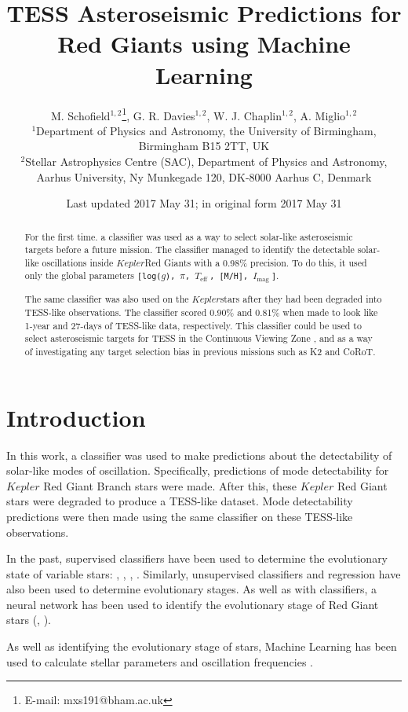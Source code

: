 \documentclass[a4paper,fleqn,usenatbib,useAMS]{mnras}
\title[Asteroseismology with Machine Learning]{TESS Asteroseismic Predictions for Red Giants using Machine Learning}
\author[M. Schofield et al.]{M. Schofield$^{1, 2}$\thanks{E-mail: mxs191@bham.ac.uk}, G. R. Davies$^{1, 2}$, W. J. Chaplin$^{1, 2}$, A. Miglio$^{1, 2}$
\\
$^{1}$Department of Physics and Astronomy, the University of Birmingham, Birmingham B15 2TT, UK \\
$^{2}$Stellar Astrophysics Centre (SAC), Department of Physics and Astronomy, Aarhus University, Ny Munkegade 120, DK-8000 Aarhus C, Denmark}
\date{Last updated 2017 May 31; in original form 2017 May 31}
\newcommand{\teff}{\ensuremath{T_{\textrm{eff}}\:}}
\newcommand{\kep}{\ensuremath{Kepler}\:}
\newcommand{\imag}{\ensuremath{I_{\textrm{mag}}\:}}
\begin{document}
\label{firstpage}
\pagerange{\pageref{firstpage}--\pageref{lastpage}}
\maketitle

\begin{abstract}
For the first time. a classifier was used as a way to select solar-like asteroseismic targets before a future mission. The classifier managed to identify the detectable solar-like oscillations inside \kep Red Giants with a 0.98\% precision. To do this, it used only the global parameters \texttt{[log($g$), $\pi$, \teff, [M/H], \imag]}.

The same classifier was also used on the \kep stars after they had been degraded into TESS-like observations. The classifier scored 0.90\% and 0.81\% when made to look like 1-year and 27-days of TESS-like data, respectively. This classifier could be used to select asteroseismic targets for TESS in the Continuous Viewing Zone \citep{ricker_transiting_2014}, and as a way of investigating any target selection bias in previous missions such as K2 and CoRoT.
\end{abstract}



\section{Introduction}

In this work, a classifier was used to make predictions about the detectability of solar-like modes of oscillation. Specifically, predictions of mode detectability for $Kepler$ Red Giant Branch stars were made. After this, these $Kepler$ Red Giant stars were degraded to produce a TESS-like dataset. Mode detectability predictions were then made using the same classifier on these TESS-like observations.

In the past, supervised classifiers have been used to determine the evolutionary state of variable stars: \citet{debosscher_automated_2007}, \citet{sarro_automated_2009}, \citet{nun_supervised_2014}, \citet{elorrieta_machine_2016}. Similarly, unsupervised classifiers \citep{valenzuela_unsupervised_2018} and regression \citep{ness_cannon_2015} have also been used to determine evolutionary stages. As well as with classifiers, a neural network has been used to identify the evolutionary stage of Red Giant stars (\citet{hon_deep_2017}, \citet{hon_deep_2018}).

As well as identifying the evolutionary stage of stars, Machine Learning has been used to calculate stellar parameters \citep{bellinger_fundamental_2016} and oscillation frequencies \citep{davies_oscillation_2016}.
\end{document}
